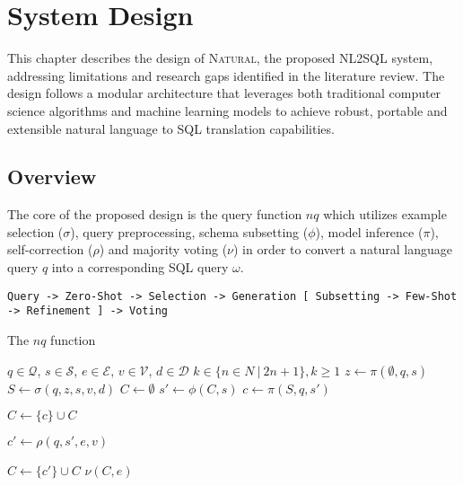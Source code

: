 \section{System Design}

This chapter describes the design of \textsc{Natural}, the proposed NL2SQL system, 
addressing limitations and research gaps identified in the literature review.
The design follows a modular architecture that leverages both traditional computer
science algorithms and machine learning models to achieve robust, portable and
extensible natural language to SQL translation capabilities.

\subsection{Overview}

The core of the proposed design is the query function $nq$ which utilizes
example selection ($\sigma$), query preprocessing, schema subsetting ($\phi$),
model inference ($\pi$), self-correction ($\rho$) and majority voting ($\nu$)
in order to convert a natural language query $q$ into a corresponding SQL query $\omega$.

\begin{verbatim}
Query -> Zero-Shot -> Selection -> Generation [ Subsetting -> Few-Shot -> Refinement ] -> Voting
\end{verbatim}

\begin{algorithm}

\caption{The $nq$ function}\label{algorithms:nq}

\begin{algorithmic}[1]
\Require $q \in \mathcal{Q}$, $s \in \mathcal{S}$, $e \in \mathcal{E}$, $v \in \mathcal{V}$, $d \in \mathcal{D}$
\Require $k \in \{ n \in N\ |\ 2n + 1 \}, k \geq 1$
\State $z \gets \pi(\emptyset,q, s)$       
\State $S \gets \sigma(q,z,s,v,d)$         
\State $C \gets \emptyset$                 
                          
    \State $s' \gets \phi(C, s)$           
    \State $c \gets \pi(S, q, s')$         

                               
        \State $C \gets \{c\} \cup C$      
    \EndIf

    \State $c' \gets \rho(q, s', e, v)$  

                              
        \State $C \gets \{c'\} \cup C$    
    \EndIf
\EndWhile
\State \Return $\nu(C, e)$               
\end{algorithmic}

\end{algorithm}

